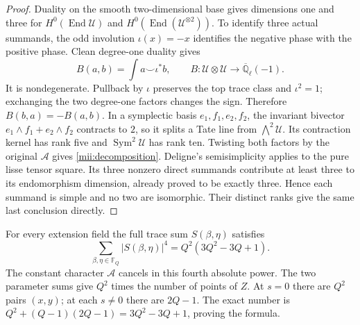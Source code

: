 \documentclass[11pt]{article}
\newcommand{\QQl}{\overline{\mathbb Q}_\ell}
\newcommand{\End}{\operatorname{End}}
\newcommand{\Sym}{\operatorname{Sym}}
\begin{document}
\begin{proof}
Duality on the smooth two-dimensional base gives dimensions one and
three for $H^0(\End\mathcal U)$ and
$H^0(\End(\mathcal U^{\otimes2}))$. To identify three actual
summands, the odd involution $\iota(x)=-x$ identifies the negative
phase with the positive phase. Clean degree-one duality gives
\[
 B(a,b)=\int a\smile\iota^*b,
 \qquad B:\mathcal U\otimes\mathcal U\longrightarrow\QQl(-1).
\]
It is nondegenerate. Pullback by $\iota$ preserves the top trace class
and $\iota^2=1$; exchanging the two degree-one factors changes the
sign. Therefore $B(b,a)=-B(a,b)$. In a symplectic basis
$e_1,f_1,e_2,f_2$, the invariant bivector
$e_1\wedge f_1+e_2\wedge f_2$ contracts to $2$, so it splits a
Tate line from $\bigwedge^2\mathcal U$. Its contraction kernel has
rank five and $\Sym^2\mathcal U$ has rank ten. Twisting both factors
by the original $\mathcal A$ gives \eqref{mii:decomposition}.
Deligne's semisimplicity applies to the pure lisse tensor square.
Its three nonzero direct summands contribute at least three to its
endomorphism dimension, already proved to be exactly three. Hence
each summand is simple and no two are isomorphic. Their distinct
ranks give the same last conclusion directly.
\end{proof}

For every extension field the full trace sum $S(\beta,\eta)$ satisfies
\begin{equation}\tag{MII13}\label{mii:moment4}
 \sum_{\beta,\eta\in\mathbb F_Q}|S(\beta,\eta)|^4
       =Q^2(3Q^2-3Q+1).
\end{equation}
The constant character $\mathcal A$ cancels in this fourth absolute
power. The two parameter sums give $Q^2$ times the number of points
of $Z$. At $s=0$ there are $Q^2$ pairs $(x,y)$; at each $s\ne0$
there are $2Q-1$. The exact number is
$Q^2+(Q-1)(2Q-1)=3Q^2-3Q+1$, proving the formula.
\end{document}
